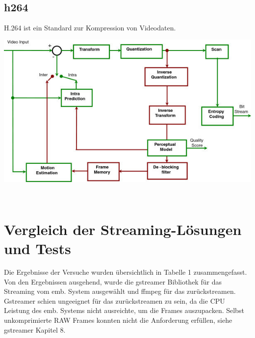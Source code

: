 \subsection{h264}
\color{red}
H.264 ist ein Standard zur Kompression von Videodaten.  \\
\color{black}

\begin{minipage}{\textwidth}
    \begin{center}
        \includegraphics[scale=3.0]{img/h264.jpg} 
    \end{center}
\end{minipage}\\


\section{Vergleich der Streaming-Lösungen und Tests} \label{RefVergleich}
Die Ergebnisse der Versuche wurden übersichtlich in Tabelle 1 zusammengefasst. Von den Ergebnissen ausgehend, wurde die gstreamer Bibliothek für das Streaming vom emb. System ausgewählt und ffmpeg für das zurückstreamen. Gstreamer schien ungeeignet für das zurückstreamen zu sein, da die CPU Leistung des emb. Systems nicht ausreichte, um die Frames auszupacken. Selbst unkomprimierte RAW Frames konnten nicht die Anforderung erfüllen, siehe gstreamer Kapitel 8.

